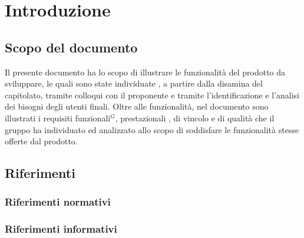 
\section{Introduzione}

\subsection{Scopo del documento}

Il presente documento ha lo scopo di illustrare le funzionalità del prodotto da sviluppare,
le quali sono state individuate , a partire dalla disamina del capitolato, tramite colloqui con 
il proponente e tramite l'identificazione e l'analisi dei bisogni degli utenti finali.
Oltre alle funzionalità, nel documento sono illustrati i requisiti funzionali$^{G}$, prestazionali , di 
vincolo e di qualità che il gruppo ha individuato ed analizzato allo scopo di soddisfare le 
funzionalità stesse offerte dal prodotto. 

\subsection{Riferimenti}
\subsubsection{Riferimenti normativi}
\subsubsection{Riferimenti informativi} 
